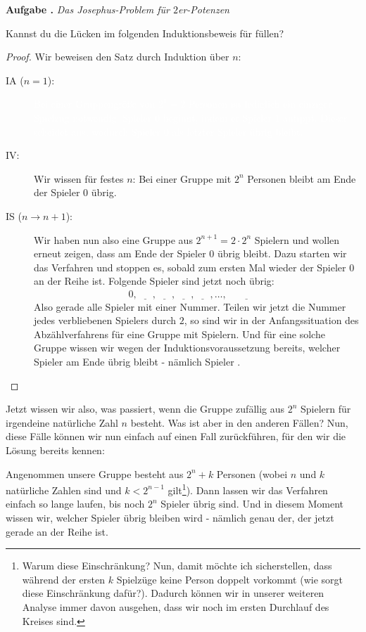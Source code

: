 \documentclass[a4paper,ngerman,12pt]{scrartcl}
\theoremstyle{definition}
\theoremstyle{plain}
\theoremstyle{remark}
\newlength{\aufgabenskip}
\newcounter{aufgabennummer}
\newenvironment{aufgabe}[1]{
	\refstepcounter{aufgabennummer}
	\textbf{Aufgabe \theaufgabennummer.} \emph{#1} \par
}{\vspace{\aufgabenskip}}
\begin{document}
\begin{aufgabe}{Das Josephus-Problem für $2$er-Potenzen}
	Kannst du die Lücken im folgenden Induktionsbeweis für  füllen?
	
	\begin{proof}
		Wir beweisen den Satz durch Induktion über $n$:
		\begin{description}
			\item[IA ($n=1$):] \textcolor{white}{Bei einer Gruppengröße von $2^1=2$ Personen ist lediglich ein einziger Spielzug notwendig: Spieler $0$ beginnt, indem er Spieler $1$ antippt. Dieser scheidet aus, wodurch Spieler $0$ als letzter Spieler übrig bleibt.}
			\item[IV:] Wir wissen für festes $n$: Bei einer Gruppe mit $2^n$ Personen bleibt am Ende der Spieler $0$ übrig.
			\item[IS ($n\to n+1$):] Wir haben nun also eine Gruppe aus $2^{n+1} = 2\cdot 2^n$ Spielern und wollen erneut zeigen, dass am Ende der Spieler $0$ übrig bleibt. Dazu starten wir das Verfahren und stoppen es, sobald zum ersten Mal wieder der Spieler $0$ an der Reihe ist. Folgende Spieler sind jetzt noch übrig:
			\[0, \underline{\phantom{2\quad}}, \underline{\phantom{4\quad}}, \underline{\phantom{6\quad}}, \underline{\phantom{8\quad}}, \dots , \underline{\phantom{ 2^{n+1}-2 }}\]
			Also gerade alle Spieler mit einer \underline{\phantom{ geraden\quad }} Nummer. Teilen wir jetzt die Nummer jedes verbliebenen Spielers durch $2$, so sind wir in der Anfangssituation des Abzählverfahrens für eine Gruppe mit \underline{\phantom{$2^n$\quad}} Spielern. Und für eine solche Gruppe wissen wir wegen der Induktionsvoraussetzung bereits, welcher Spieler am Ende übrig bleibt - nämlich Spieler \underline{\phantom{$0$\quad}}. \qedhere
		\end{description}
	\end{proof}
\end{aufgabe}

Jetzt wissen wir also, was passiert, wenn die Gruppe zufällig aus $2^n$ Spielern für irgendeine natürliche Zahl $n$ besteht. Was ist aber in den anderen Fällen? Nun, diese Fälle können wir nun einfach auf einen Fall zurückführen, für den wir die Lösung bereits kennen:

Angenommen unsere Gruppe besteht aus $2^n + k$ Personen (wobei $n$ und $k$ natürliche Zahlen sind und $k < 2^{n-1}$ gilt\footnote{Warum diese Einschränkung? Nun, damit möchte ich sicherstellen, dass während der ersten $k$ Spielzüge keine Person doppelt vorkommt (wie sorgt diese Einschränkung dafür?). Dadurch können wir in unserer weiteren Analyse immer davon ausgehen, dass wir noch im ersten Durchlauf des Kreises sind.}). Dann lassen wir das Verfahren einfach so lange laufen, bis noch $2^n$ Spieler übrig sind. Und in diesem Moment wissen wir, welcher Spieler übrig bleiben wird - nämlich genau der, der jetzt gerade an der Reihe ist.
\end{document}
